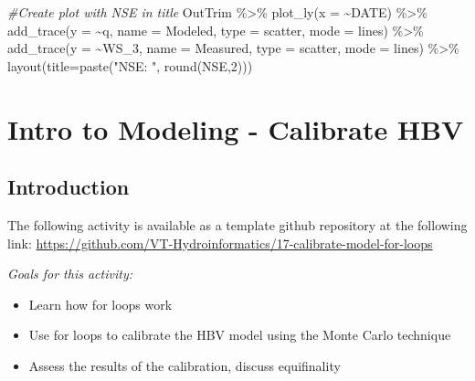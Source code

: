 \documentclass[
]{book}
\newenvironment{Shaded}{\begin{snugshade}}{\end{snugshade}}
\newcommand{\AttributeTok}[1]{\textcolor[rgb]{0.77,0.63,0.00}{#1}}
\newcommand{\CommentTok}[1]{\textcolor[rgb]{0.56,0.35,0.01}{\textit{#1}}}
\newcommand{\DecValTok}[1]{\textcolor[rgb]{0.00,0.00,0.81}{#1}}
\newcommand{\FunctionTok}[1]{\textcolor[rgb]{0.00,0.00,0.00}{#1}}
\newcommand{\NormalTok}[1]{#1}
\newcommand{\SpecialCharTok}[1]{\textcolor[rgb]{0.00,0.00,0.00}{#1}}
\newcommand{\StringTok}[1]{\textcolor[rgb]{0.31,0.60,0.02}{#1}}
\providecommand{\tightlist}{%
  \setlength{\itemsep}{0pt}\setlength{\parskip}{0pt}}
\begin{document}
\begin{Shaded}
\begin{Highlighting}[]
\CommentTok{\#Create plot with NSE in title}
\NormalTok{OutTrim }\SpecialCharTok{\%\textgreater{}\%} \FunctionTok{plot\_ly}\NormalTok{(}\AttributeTok{x =} \SpecialCharTok{\textasciitilde{}}\NormalTok{DATE) }\SpecialCharTok{\%\textgreater{}\%} 
        \FunctionTok{add\_trace}\NormalTok{(}\AttributeTok{y =} \SpecialCharTok{\textasciitilde{}}\NormalTok{q, }\AttributeTok{name =} \StringTok{\textquotesingle{}Modeled\textquotesingle{}}\NormalTok{,  }\AttributeTok{type =} \StringTok{\textquotesingle{}scatter\textquotesingle{}}\NormalTok{, }\AttributeTok{mode =} \StringTok{\textquotesingle{}lines\textquotesingle{}}\NormalTok{) }\SpecialCharTok{\%\textgreater{}\%} 
        \FunctionTok{add\_trace}\NormalTok{(}\AttributeTok{y =} \SpecialCharTok{\textasciitilde{}}\NormalTok{WS\_3, }\AttributeTok{name =} \StringTok{\textquotesingle{}Measured\textquotesingle{}}\NormalTok{, }\AttributeTok{type =} \StringTok{\textquotesingle{}scatter\textquotesingle{}}\NormalTok{, }\AttributeTok{mode =} \StringTok{\textquotesingle{}lines\textquotesingle{}}\NormalTok{) }\SpecialCharTok{\%\textgreater{}\%} 
        \FunctionTok{layout}\NormalTok{(}\AttributeTok{title=}\FunctionTok{paste}\NormalTok{(}\StringTok{"NSE: "}\NormalTok{, }\FunctionTok{round}\NormalTok{(NSE,}\DecValTok{2}\NormalTok{)))}
\end{Highlighting}
\end{Shaded}

\hypertarget{modelingcalibration}{%
\chapter{Intro to Modeling - Calibrate HBV}\label{modelingcalibration}}

\hypertarget{introduction-5}{%
\section{Introduction}\label{introduction-5}}

The following activity is available as a template github repository at the following link: \url{https://github.com/VT-Hydroinformatics/17-calibrate-model-for-loops}

\emph{Goals for this activity:}

\begin{itemize}
\tightlist
\item
  Learn how for loops work
\item
  Use for loops to calibrate the HBV model using the Monte Carlo technique
\item
  Assess the results of the calibration, discuss equifinality
\end{itemize}
\end{document}

